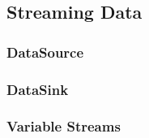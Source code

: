 \subsection{Streaming Data}

\subsubsection{DataSource}

\subsubsection{DataSink}

\subsubsection{Variable Streams}



